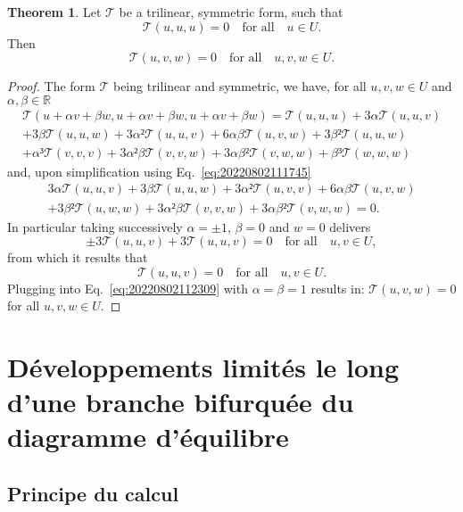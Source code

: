\documentclass[12pt, final]{scrartcl}
\theoremstyle{definition}
\newtheorem{theorem}{Theorem}
\begin{document}
\begin{theorem}
  \label{thr:20220802112835}
  Let \(𝒯\) be a trilinear, symmetric form, such that
  \begin{equation}
    \label{eq:20220802111745}
    𝒯(u, u, u) = 0 \quad \text{for all} \quad u ∈ U.
  \end{equation}
  Then
  \begin{equation}
    𝒯(u, v, w) = 0 \quad \text{for all} \quad u, v, w ∈ U.
  \end{equation}
\end{theorem}
\begin{proof}
  The form \(𝒯\) being trilinear and symmetric, we have, for all \(u, v, w ∈ U\)
  and \(α, β ∈ ℝ\)
  \begin{multline}
    𝒯(u + αv + βw, u + αv + βw, u + αv + βw) = 𝒯(u, u, u) + 3α 𝒯(u, u, v)\\
    + 3β 𝒯(u, u, w) + 3α² 𝒯(u, u, v) + 6 α β 𝒯(u, v, w) + 3 β² 𝒯(u, u, w)\\
    + α³ 𝒯(v, v, v) + 3 α² β 𝒯(v, v, w) + 3 α β² 𝒯(v, w, w) + β³ 𝒯(w, w, w)
  \end{multline}
  and, upon simplification using Eq.~\eqref{eq:20220802111745}
  \begin{multline}
    \label{eq:20220802112309}
    3α 𝒯(u, u, v) + 3β 𝒯(u, u, w) + 3α² 𝒯(u, v, v) + 6 α β 𝒯(u, v, w)\\
    + 3 β² 𝒯(u, w, w) + 3 α² β 𝒯(v, v, w) + 3 α β² 𝒯(v, w, w) = 0.
  \end{multline}
  In particular taking successively \(α = ±1\), \(β = 0\) and \(w = 0\) delivers
  \begin{equation}
    ±3 𝒯(u, u, v) + 3 𝒯(u, u, v) = 0 \quad \text{for all} \quad u, v ∈ U,
  \end{equation}
  from which it results that
  \begin{equation}
    𝒯(u, u, v) = 0 \quad \text{for all} \quad u, v ∈ U.
  \end{equation}
  Plugging into Eq.~\eqref{eq:20220802112309} with \(α = β = 1\) results in:
  \(𝒯(u, v, w) = 0\) for all \(u, v, w ∈ U\).
\end{proof}

\appendix
\section{Développements limités le long d'une branche bifurquée du diagramme d'équilibre}

\subsection{Principe du calcul}
\label{sec:20220107121442}
%
\end{document}
